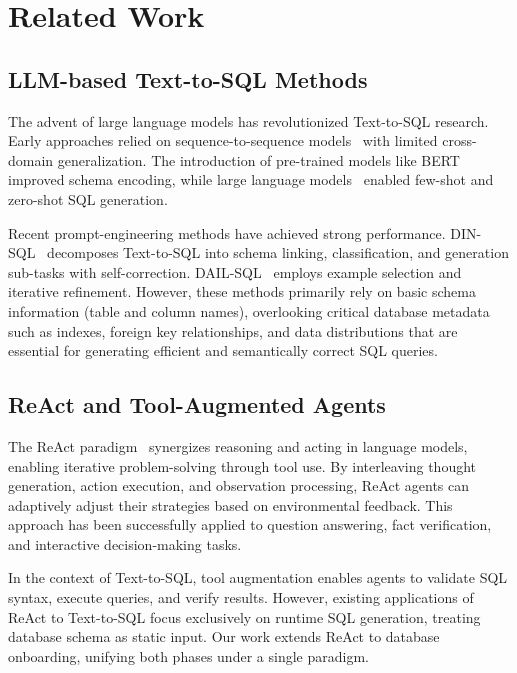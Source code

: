 \section{Related Work}

\subsection{LLM-based Text-to-SQL Methods}

The advent of large language models has revolutionized Text-to-SQL research. Early approaches relied on sequence-to-sequence models~\cite{zhong2017seq2sql,xu2017sqlnet} with limited cross-domain generalization. The introduction of pre-trained models like BERT~\cite{devlin2019bert} improved schema encoding, while large language models~\cite{brown2020language,achiam2023gpt4} enabled few-shot and zero-shot SQL generation.

Recent prompt-engineering methods have achieved strong performance. DIN-SQL~\cite{pourreza2024dail} decomposes Text-to-SQL into schema linking, classification, and generation sub-tasks with self-correction. DAIL-SQL~\cite{gao2024dail} employs example selection and iterative refinement. However, these methods primarily rely on basic schema information (table and column names), overlooking critical database metadata such as indexes, foreign key relationships, and data distributions that are essential for generating efficient and semantically correct SQL queries.

\subsection{ReAct and Tool-Augmented Agents}

The ReAct paradigm~\cite{yao2023react} synergizes reasoning and acting in language models, enabling iterative problem-solving through tool use. By interleaving thought generation, action execution, and observation processing, ReAct agents can adaptively adjust their strategies based on environmental feedback. This approach has been successfully applied to question answering, fact verification, and interactive decision-making tasks.

In the context of Text-to-SQL, tool augmentation enables agents to validate SQL syntax, execute queries, and verify results. However, existing applications of ReAct to Text-to-SQL focus exclusively on runtime SQL generation, treating database schema as static input. Our work extends ReAct to database onboarding, unifying both phases under a single paradigm.

